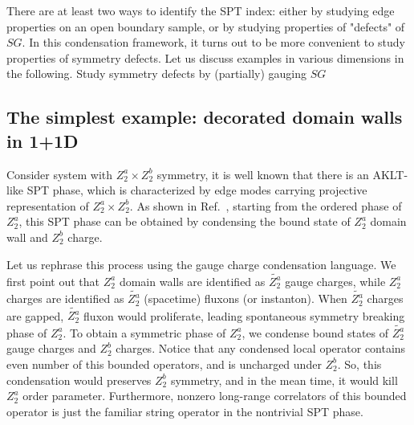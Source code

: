 \documentclass[reprint,amsmath,amssymb,aps,pra,]{revtex4-1}
\begin{document}
There are at least two ways to identify the SPT index: either by studying edge properties on an open boundary sample, or by studying properties of "defects" of $SG$.
In this condensation framework, it turns out to be more convenient to study properties of symmetry defects.
Let us discuss examples in various dimensions in the following.
{\color{red} Study symmetry defects by (partially) gauging $SG$}

\subsection{The simplest example: decorated domain walls in 1+1D}
Consider system with $Z_2^a\times Z_2^b$ symmetry, it is well known that there is an AKLT-like SPT phase, which is characterized by edge modes carrying projective representation of $Z_2^a\times Z_2^b$.
As shown in Ref.~, starting from the ordered phase of $Z_2^a$, this SPT phase can be obtained by condensing the bound state of $Z_2^a$ domain wall and $Z_2^b$ charge.

Let us rephrase this process using the gauge charge condensation language.
We first point out that $Z_2^a$ domain walls are identified as $\widetilde{Z_2^a}$ gauge charges, while $Z_2^a$ charges are identified as $\widetilde{Z_2^a}$ (spacetime) fluxons (or instanton).
When $\widetilde{Z_2^a}$ charges are gapped, $\widetilde{Z_2^a}$ fluxon would proliferate, leading spontaneous symmetry breaking phase of $Z_2^a$.
To obtain a symmetric phase of $Z_2^a$, we condense bound states of $\widetilde{Z_2^a}$ gauge charges and $Z_2^b$ charges. 
Notice that any condensed local operator contains even number of this bounded operators, and is uncharged under $Z_2^b$.
So, this condensation would preserves $Z_2^b$ symmetry, and in the mean time, it would kill $Z_2^a$ order parameter.
Furthermore, nonzero long-range correlators of this bounded operator is just the familiar string operator in the nontrivial SPT phase\cite{PollmannTurner2012}.

\end{document}
